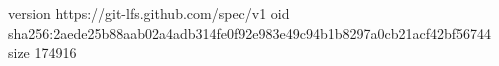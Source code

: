 version https://git-lfs.github.com/spec/v1
oid sha256:2aede25b88aab02a4adb314fe0f92e983e49c94b1b8297a0cb21acf42bf56744
size 174916
